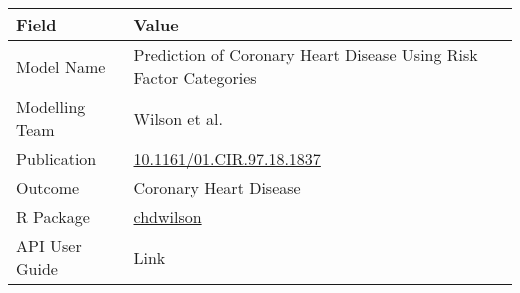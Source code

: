 \documentclass[
]{book}
\begin{document}
\begin{longtable}[]{@{}ll@{}}
\toprule
\begin{minipage}[b]{0.45\columnwidth}\raggedright
Field\strut
\end{minipage} & \begin{minipage}[b]{0.49\columnwidth}\raggedright
Value\strut
\end{minipage}\tabularnewline
\midrule
\endhead
\begin{minipage}[t]{0.45\columnwidth}\raggedright
Model Name\strut
\end{minipage} & \begin{minipage}[t]{0.49\columnwidth}\raggedright
Prediction of Coronary Heart Disease Using Risk Factor Categories\strut
\end{minipage}\tabularnewline
\begin{minipage}[t]{0.45\columnwidth}\raggedright
Modelling Team\strut
\end{minipage} & \begin{minipage}[t]{0.49\columnwidth}\raggedright
Wilson et al.\strut
\end{minipage}\tabularnewline
\begin{minipage}[t]{0.45\columnwidth}\raggedright
Publication\strut
\end{minipage} & \begin{minipage}[t]{0.49\columnwidth}\raggedright
\href{https://doi.org/10.1161/01.CIR.97.18.1837}{10.1161/01.CIR.97.18.1837}\strut
\end{minipage}\tabularnewline
\begin{minipage}[t]{0.45\columnwidth}\raggedright
Outcome\strut
\end{minipage} & \begin{minipage}[t]{0.49\columnwidth}\raggedright
Coronary Heart Disease\strut
\end{minipage}\tabularnewline
\begin{minipage}[t]{0.45\columnwidth}\raggedright
R Package\strut
\end{minipage} & \begin{minipage}[t]{0.49\columnwidth}\raggedright
\href{https://github.com/resplab/chdwilson}{chdwilson}\strut
\end{minipage}\tabularnewline
\begin{minipage}[t]{0.45\columnwidth}\raggedright
API User Guide\strut
\end{minipage} & \begin{minipage}[t]{0.49\columnwidth}\raggedright
Link\strut
\end{minipage}\tabularnewline
\bottomrule
\end{longtable}
\end{document}
